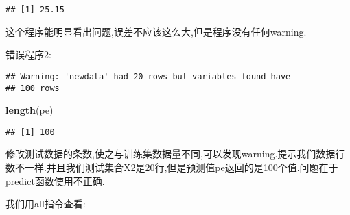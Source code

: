 \documentclass[]{ctexbook}
\newenvironment{Shaded}{\begin{snugshade}}{\end{snugshade}}
\newcommand{\DataTypeTok}[1]{\textcolor[rgb]{0.13,0.29,0.53}{#1}}
\newcommand{\DecValTok}[1]{\textcolor[rgb]{0.00,0.00,0.81}{#1}}
\newcommand{\FloatTok}[1]{\textcolor[rgb]{0.00,0.00,0.81}{#1}}
\newcommand{\KeywordTok}[1]{\textcolor[rgb]{0.13,0.29,0.53}{\textbf{#1}}}
\newcommand{\NormalTok}[1]{#1}
\newcommand{\OperatorTok}[1]{\textcolor[rgb]{0.81,0.36,0.00}{\textbf{#1}}}
\newcommand{\StringTok}[1]{\textcolor[rgb]{0.31,0.60,0.02}{#1}}
\begin{document}
\begin{verbatim}
## [1] 25.15
\end{verbatim}

这个程序能明显看出问题,误差不应该这么大,但是程序没有任何warning.

错误程序2:

\begin{Shaded}
\end{Shaded}

\begin{verbatim}
## Warning: 'newdata' had 20 rows but variables found have
## 100 rows
\end{verbatim}

\begin{Shaded}
\begin{Highlighting}[]
\KeywordTok{length}\NormalTok{(pe)}
\end{Highlighting}
\end{Shaded}

\begin{verbatim}
## [1] 100
\end{verbatim}

修改测试数据的条数,使之与训练集数据量不同,可以发现warning.提示我们数据行数不一样.并且我们测试集合X2是20行,但是预测值pe返回的是100个值.问题在于predict函数使用不正确.

我们用all指令查看:
\end{document}
